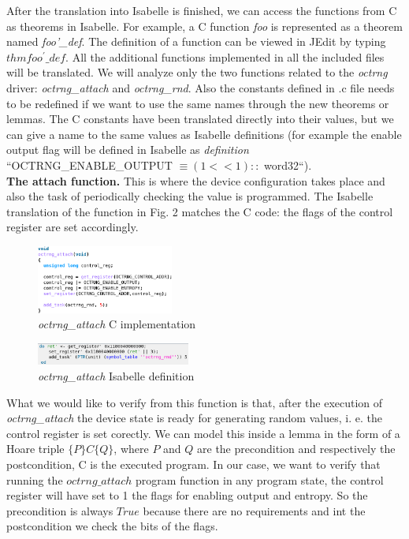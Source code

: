 \documentclass[conference]{IEEEtran}
\begin{document}
After the translation into Isabelle is finished, we can access the functions from C as theorems in Isabelle. For example, a C function \textit{foo} is represented as a theorem named \textit{foo’\_def}. The definition of a function can be viewed in JEdit by typing $thm foo^\prime\_def$. All the additional functions implemented in all the included files will be translated. We will analyze only the two functions related to the \textit{octrng} driver: \textit{octrng\_attach} and \textit{octrng\_rnd}. Also the constants defined in .c file needs to be redefined if we want to use the same names through the new theorems or lemmas. The C constants have been translated directly into their values, but we can give a name to the same values as Isabelle definitions (for example the enable output flag will be defined in Isabelle as \textit{definition} ``OCTRNG\_ENABLE\_OUTPUT $\equiv (1 << 1) :: $ word32``).\\
\textbf{The attach function.} This is where the device configuration takes place and also the task of periodically checking the value is programmed. The Isabelle translation of the function in Fig. 2 matches the C code: the flags of the control register are set accordingly. \\
\begin{figure}[htbp]
\centerline{\includegraphics[width=0.4\textwidth]{attach_c.png}}
\caption{\textit{octrng\_attach} C implementation} 
\label{fig}
\end{figure}
\begin{figure}[htbp]
\centerline{\includegraphics[width=0.45\textwidth]{attach_thy.png}}
\caption{\textit{octrng\_attach} Isabelle definition} 
\label{fig}
\end{figure}
What we would like to verify from this function is that, after the execution of \textit{octrng\_attach} the device state is ready for generating random values, i. e. the control register is set corectly. We can model this inside a lemma in the form of a Hoare triple $\{P\} C \{Q\}$, where $P$ and $Q$ are the precondition and respectively the postcondition, C is the executed program. In our case, we want to verify that running the $octrng\_attach$ program function in any program state, the control register will have set to 1 the flags for enabling output and entropy. So the precondition is always $True$ because there are no requirements and int the postcondition we check the bits of the flags. 
\end{document}
